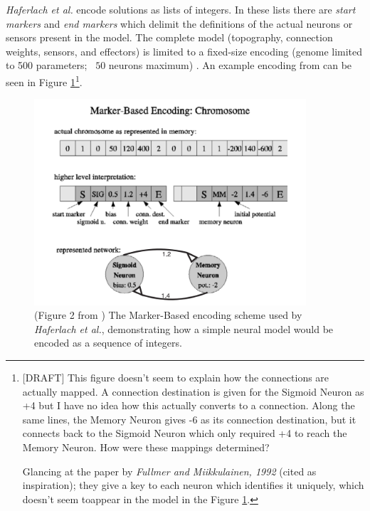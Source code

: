 \documentclass[a4paper,11pt,twoside,openright]{article}
\begin{document}
\textit{Haferlach et al.} encode solutions as lists of integers. In these lists
there are \textit{start markers} and \textit{end markers} which delimit
the definitions of the actual neurons or sensors present in the model. The
complete model (topography, connection weights, sensors, and effectors) is
limited to a fixed-size encoding (genome limited to 500 parameters; ~$50$ neurons
maximum) \cite{Haferlach2007}. An example encoding from \cite{Haferlach2007} can
be seen in Figure \ref{fig:markerbasedencoding}\footnote{[DRAFT] This figure
  doesn't seem to explain how the connections are actually mapped. A connection
  destination is given for the Sigmoid Neuron as +4 but I have no idea
  how this actually converts to a connection. Along the same lines, the
  Memory Neuron gives -6 as its connection destination, but it connects back
  to the Sigmoid Neuron which only required +4 to reach the Memory Neuron. How
  were these mappings determined?

  Glancing at the paper by \textit{Fullmer and Miikkulainen, 1992} (cited as
  inspiration); they give a key to each neuron which identifies it uniquely,
  which doesn't seem toappear in the model in the Figure
  \ref{fig:markerbasedencoding}.
}.
\newline
\par


\begin{figure}[h!]
  \centering
  \includegraphics[width=0.9\textwidth]{MarkerBasedEncoding}
  \caption{\label{fig:markerbasedencoding} (Figure 2 from \cite{Haferlach2007})
    The Marker-Based encoding scheme used by \textit{Haferlach et al.},
    demonstrating how a simple neural model would be encoded as a sequence of
    integers.}
\end{figure}
\end{document}
